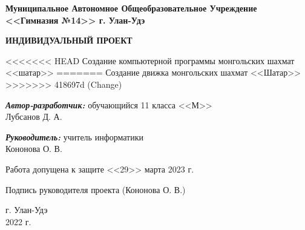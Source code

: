 \begin{titlepage}
	\begin{center}
		\textbf{ 
			Муниципальное Автономное Общеобразовательное Учреждение \\
			<<Гимназия №14>> г. Улан-Удэ
		}
		
		\vspace{4em}
		\textbf{
			ИНДИВИДУАЛЬНЫЙ ПРОЕКТ
		}
		\vspace{6em}
		
<<<<<<< HEAD
		Создание компьютерной программы монгольских шахмат <<шатар>>
=======
		Создание движка монгольских шахмат <<Шатар>>
>>>>>>> 418697d (Change)
		
	\end{center}
	\vspace{8em}
	\begin{flushright}
		
		\textbf{\textit{Автор-разработчик:}}
		обучающийся 11 класса <<М>> \\
		Лубсанов Д. А.
		
		\vspace{2em}
		
		\textbf{\textit{Руководитель:}}
		учитель информатики \\
		Кононова О. В.
		
	\end{flushright}
	
	\vspace{6em}
	
	Работа допущена к защите <<29>> марта 2023 г.
	
	\vspace{1em}
	
	Подпись руководителя проекта \hrulefill (Кононова О. В.)
	
	\vspace{4em}
	
	\begin{center}
		г. Улан-Удэ \\
		2022 г.
	\end{center}
	
	\clearpage
\end{titlepage}
